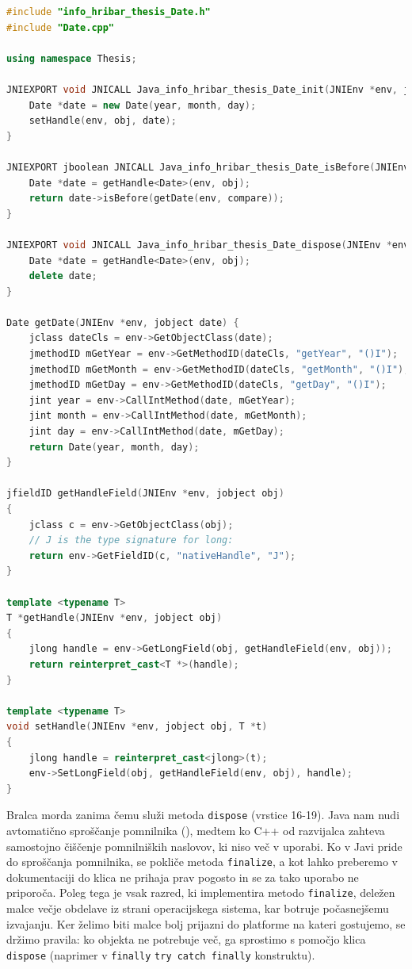 \begin{lstlisting}[caption={Primer mosta med jezikoma Java in C++ razreda \texttt{Date}.}, label=code:android-cpp-wrapper, language=C++]
#include "info_hribar_thesis_Date.h"
#include "Date.cpp"

using namespace Thesis;

JNIEXPORT void JNICALL Java_info_hribar_thesis_Date_init(JNIEnv *env, jobject obj, jint year, jint month, jint day) {
	Date *date = new Date(year, month, day);
	setHandle(env, obj, date);
}

JNIEXPORT jboolean JNICALL Java_info_hribar_thesis_Date_isBefore(JNIEnv *env, jobject obj, jobject compare) {
	Date *date = getHandle<Date>(env, obj);
	return date->isBefore(getDate(env, compare));
}

JNIEXPORT void JNICALL Java_info_hribar_thesis_Date_dispose(JNIEnv *env, jobject obj) {
	Date *date = getHandle<Date>(env, obj);
	delete date;
}

Date getDate(JNIEnv *env, jobject date) {
	jclass dateCls = env->GetObjectClass(date);
	jmethodID mGetYear = env->GetMethodID(dateCls, "getYear", "()I");
	jmethodID mGetMonth = env->GetMethodID(dateCls, "getMonth", "()I");
	jmethodID mGetDay = env->GetMethodID(dateCls, "getDay", "()I");
	jint year = env->CallIntMethod(date, mGetYear);
	jint month = env->CallIntMethod(date, mGetMonth);
	jint day = env->CallIntMethod(date, mGetDay);
	return Date(year, month, day);
}

jfieldID getHandleField(JNIEnv *env, jobject obj)
{
    jclass c = env->GetObjectClass(obj);
    // J is the type signature for long:
    return env->GetFieldID(c, "nativeHandle", "J");
}

template <typename T>
T *getHandle(JNIEnv *env, jobject obj)
{
    jlong handle = env->GetLongField(obj, getHandleField(env, obj));
    return reinterpret_cast<T *>(handle);
}

template <typename T>
void setHandle(JNIEnv *env, jobject obj, T *t)
{
    jlong handle = reinterpret_cast<jlong>(t);
    env->SetLongField(obj, getHandleField(env, obj), handle);
}
\end{lstlisting}

Bralca morda zanima čemu služi metoda \texttt{dispose} (vrstice 16-19). Java nam nudi avtomatično sproščanje pomnilnika (), medtem ko C++ od razvijalca zahteva samostojno čiščenje pomnilniških naslovov, ki niso več v uporabi. Ko v Javi pride do sproščanja pomnilnika, se pokliče metoda \texttt{finalize}, a kot lahko preberemo v dokumentaciji\cite{android-object} do klica ne prihaja prav pogosto in se za tako uporabo ne priporoča. Poleg tega je vsak razred, ki implementira metodo \texttt{finalize}, deležen malce večje obdelave iz strani operacijskega sistema, kar botruje počasnejšemu izvajanju. Ker želimo biti malce bolj prijazni do platforme na kateri gostujemo, se držimo pravila: ko objekta ne potrebuje več, ga sprostimo s pomočjo klica \texttt{dispose} (naprimer v \texttt{finally} \texttt{try catch finally} konstruktu).


